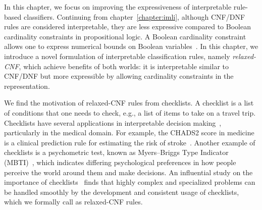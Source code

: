 
\label{chapter:crr}


In this chapter, we focus on improving the expressiveness of interpretable rule-based classifiers. Continuing from chapter~\ref{chapter:imli},
although CNF/DNF rules are considered interpretable, they are less expressive compared to Boolean cardinality constraints in propositional logic. A Boolean cardinality constraint allows one to express numerical bounds on Boolean variables~\cite{sinz2005towards}. In this chapter, we introduce a novel formulation of interpretable classification rules, namely \emph{relaxed-CNF}, which achieve benefits of  both worlds: it is interpretable similar to CNF/DNF  but more expressible by allowing cardinality constraints in the representation.


We find the motivation of relaxed-CNF rules from checklists. A checklist is a list of conditions that one needs to check, e.g., a list of items to take on a travel trip.  Checklists have several applications in interpretable decision making~\cite{M1976,gage2001validation}, particularly in the medical domain. For example, the  CHADS2 score in medicine is a clinical prediction rule for estimating the risk of stroke~\cite{gage2001validation}. Another example of checklists is a psychometric test, known as Myers–Briggs Type Indicator (MBTI)~\cite{M1976}, which indicates differing psychological preferences in how people perceive the world around them and make decisions.  An influential study on the importance of {checklists}~\cite{G2010} finds that highly complex and specialized problems can be handled smoothly by the development and consistent usage of checklists, which we formally call as relaxed-CNF rules. 


